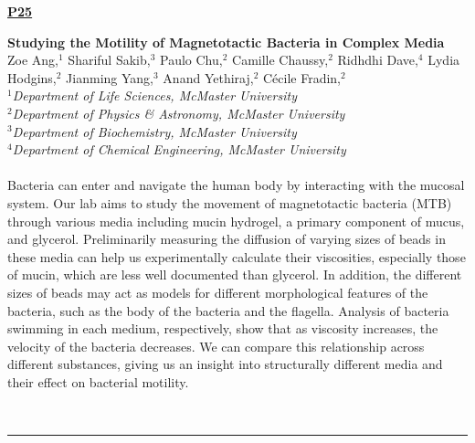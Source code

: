 \documentclass[titlepage,oneside,openany,10pt]{book}
\newenvironment{posterabs}[4] %
        {
	\begin{flushright}
                \underline{\textbf{#4}}
        \end{flushright}
        \textbf{#1}\\%
        #2\\%
        \textit{#3}\\\\%
        }
        {
        \\
        \noindent\rule{15cm}{0.5pt}%
        }
\begin{document}
\begin{posterabs}
	{Studying the Motility of Magnetotactic Bacteria in Complex Media}
	{Zoe Ang,$^{1}$ Shariful Sakib,$^{3}$ Paulo Chu,$^{2}$ Camille Chaussy,$^{2}$ Ridhdhi Dave,$^{4}$ Lydia Hodgins,$^{2}$ Jianming Yang,$^{3}$ Anand Yethiraj,$^{2}$ C\'{e}cile Fradin,$^{2}$}
	{
	$^1$Department of Life Sciences, McMaster University\\
	$^2$Department of Physics \& Astronomy, McMaster University\\
	$^3$Department of Biochemistry, McMaster University\\
	$^4$Department of Chemical Engineering, McMaster University
	}
	{P25}
	Bacteria can enter and navigate the human body by interacting with the mucosal system. Our lab aims to study the movement of magnetotactic bacteria (MTB) through various media including mucin hydrogel, a primary component of mucus, and glycerol. Preliminarily measuring the diffusion of varying sizes of beads in these media can help us experimentally calculate their viscosities, especially those of mucin, which are less well documented than glycerol. In addition, the different sizes of beads may act as models for different morphological features of the bacteria, such as the body of the bacteria and the flagella. Analysis of bacteria swimming in each medium, respectively, show that as viscosity increases, the velocity of the bacteria decreases. We can compare this relationship across different substances, giving us an insight into structurally different media and their effect on bacterial motility.
	\label{AngZ}
\end{posterabs}
\end{document}
